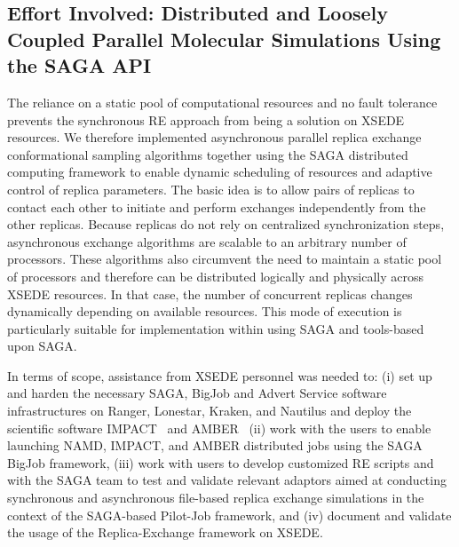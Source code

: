 \documentclass{sig-alternate}
\begin{document}
\subsection{Effort Involved: Distributed and Loosely Coupled Parallel Molecular Simulations
Using the SAGA API}
% 
The reliance on a static pool of computational resources and no
fault tolerance prevents the synchronous RE approach from being a
solution on XSEDE resources. We therefore implemented asynchronous
parallel replica exchange conformational sampling algorithms together
using the SAGA distributed computing framework to enable dynamic
scheduling of resources and adaptive control of replica
parameters. The basic idea is to allow pairs of replicas to contact
each other to initiate and perform exchanges independently from the
other replicas. Because replicas do not rely on centralized
synchronization steps, asynchronous exchange algorithms are scalable to an
arbitrary number of processors. These algorithms also circumvent
the need to maintain a static pool of processors and therefore
can be distributed logically and physically across XSEDE resources.
In that case, the number of concurrent replicas changes dynamically
depending on available resources. This mode of execution is particularly
suitable for implementation within using SAGA and tools-based upon SAGA.

In terms of scope, assistance from XSEDE personnel was needed to: (i) set up and
harden the necessary SAGA, BigJob and Advert Service software infrastructures on
Ranger, Lonestar, Kraken, and Nautilus and deploy the scientific software
IMPACT~\cite{IMPACT} and AMBER~\cite{AMBER} (ii) work with the
users to enable launching NAMD, IMPACT, and AMBER distributed jobs using the
SAGA BigJob framework, (iii) work with users to develop customized RE scripts
and with the SAGA team to test and validate relevant adaptors aimed at
conducting synchronous and asynchronous ﬁle-based replica exchange simulations
in the context of the SAGA-based Pilot-Job framework, and (iv)  document and
validate the usage of the Replica-Exchange framework on XSEDE.
\end{document}
